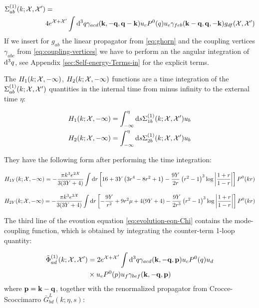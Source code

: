 \begin{align}
\Sigma_{ab}^{(1)}(k;\mathcal{X},\mathcal{X}') & =\nonumber \\
 & 4e^{\mathcal{X}+\mathcal{X}'}\int\mathrm{d}^{3}q\gamma_{acd}(\mathbf{k},\mathbf{-q},\mathbf{q-k})u_{c}P^{0}(q)u_{e}\gamma_{feb}(\mathbf{k-q},\mathbf{q},\mathbf{-k})g_{df}(\mathcal{X},\mathcal{X}')
\end{align}
If we insert for $g_{ab}$ the linear propagator from \ref{eq:ghorn}
and the coupling vertices $\gamma_{abc}$ from \ref{eq:coupling-vertices}
we have to perform an the angular integration of $\mathrm{d}^{3}q$, see Appendix
\ref{sec:Self-energy-Terms-in} for the explicit terms.

The $H_{1}(k;\mathcal{X},-\infty)$, $H_{2}(k;\mathcal{X},-\infty)$ functions
are a time integration of the $\Sigma_{ab}^{(1)}(k;\mathcal{X},\mathcal{X}')$
quantities in the internal time from minus infinity to the external
time $\eta$:

\begin{align}
H_{1}(k;\mathcal{X},-\infty) & =\int_{-\infty}^{\eta}\mathrm{d} s\Sigma_{1b}^{(1)}(k;\mathcal{X},\mathcal{X}')u_{b}\\
H_{2}(k;\mathcal{X},-\infty) & =\int_{-\infty}^{\eta}\mathrm{d} s\Sigma_{2b}^{(1)}(k;\mathcal{X},\mathcal{X}')u_{b}
\end{align}


They have the following form after performing the time integration:

\begin{equation}
H_{1Y}(k;\mathcal{X},-\infty)=-\frac{\pi k^{3}e^{2\mathcal{X}}}{3(3Y+4)}\int\mathrm{d} r\left[16+3Y\left(3r^{4}-8r^{2}+1\right)-\frac{9Y}{2r}\left(r^{2}-1\right)^{3}\log\left|\frac{1+r}{1-r}\right|\right]P^{0}(kr)\label{eq:H1}
\end{equation}


\begin{equation}
H_{2Y}(k;\mathcal{X},-\infty)=-\frac{\pi k^{3}e^{2\mathcal{X}}}{3(3Y+4)}\int\mathrm{d} r\left[-\frac{9Y}{r^{2}}+9r^{2}\mu+4(9Y+4)-\frac{9Y}{2r^{3}}\left(r^{2}-1\right)^{3}\log\left|\frac{1+r}{1-r}\right|\right]P^{0}(kr)\label{eq:H2}
\end{equation}


The third line of the evoution equation \ref{eq:evolution-eqn-Chi}
contains the mode-coupling function, which is obtained by integrating
the counter-term 1-loop quantity:

\begin{align}
\tilde{\Phi}_{ad}^{(1)}(k;\mathcal{X},\mathcal{X}') & =2e^{\mathcal{X}+\mathcal{X}'}\int\mathrm{d}^{3}q\gamma_{acd}(\mathbf{k},-\mathbf{q},\mathbf{p})u_{c}P^{0}(q)u_{d}\\
 & \times u_{e}P^{0}(p)u_{f}\gamma_{bef}(\mathbf{k},-\mathbf{q},\mathbf{p})\label{eq:PhiTilde_ad}
\end{align}
where $\mathbf{p}=\mathbf{k}-\mathbf{q}$, together with the renormalized propagator
from Crocce-Scoccimarro $\bar{G}_{bd}^{L}(k;\eta,s)$:

